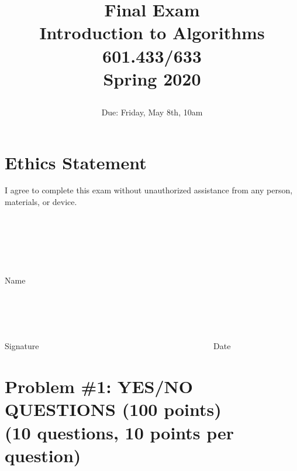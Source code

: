 \documentclass[letterpaper, 11pt]{article}
\begin{document}
\setlength{\parindent}{0em}
\setlength{\parskip}{1em}


\title{{\huge Final Exam \\ Introduction to Algorithms \\ 601.433/633 \\Spring 2020}
\date{Due: Friday,  May 8th, 10am} }


\maketitle

\section*{Ethics Statement}

{\huge I agree to complete this exam without unauthorized assistance from
      any person, materials, or device.}

\ \

\ \ \

\


{\huge Name   \ \ \ \ \ \ \ \ \ \ \ \ \ \ \ \ \ \ \ \  \ \ \ \ \ \ \ \ \ \ \ \ \ \ \ \ \ \ \ \ \ \                    }


\ \\
\ \\
\ \\
\ \\



{\huge Signature   \ \ \ \ \ \ \ \ \ \ \ \ \ \ \ \ \ \ \ \  \ \ \ \ \ \ \ \ \ \ \ \ \ \ \ \ \ \ \ \ \ \                 Date   }

\newpage


\section{Problem \#1: YES/NO QUESTIONS (100 points)\\ (10 questions, 10 points per question)}
\end{document}
